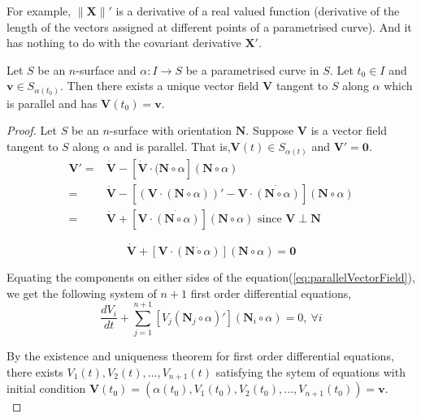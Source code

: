 	
	For example, $\|\mathbf{X}\|'$ is a derivative of a real valued function (derivative of the length of the vectors assigned at different points of a parametrised curve).
	And it has nothing to do with the covariant derivative $\mathbf{X}'$.


\begin{theorem}
	Let $S$ be an $n$-surface and $\alpha : I \to S$ be a parametrised curve in $S$.
	Let $t_0 \in I$ and $\mathbf{v} \in S_{\alpha(t_0)}$.
	Then there exists a unique vector field $\mathbf{V}$ tangent to $S$ along $\alpha$ which is parallel and has $\mathbf{V}(t_0) = \mathbf{v}$.
\end{theorem}
\begin{proof}
	Let $S$ be an $n$-surface with orientation $\mathbf{N}$.
	Suppose $\mathbf{V}$ is a vector field tangent to $S$ along $\alpha$ and is parallel.
	That is,$\mathbf{V}(t) \in S_{\alpha(t)}$ and $\mathbf{V}' = \mathbf{0}$.
\begin{align*}
	\mathbf{V}' = & \dot{\mathbf{V}} - \left[ \dot{\mathbf{V}} \cdot (\mathbf{N} \circ \alpha \right] (\mathbf{N} \circ \alpha) \\
	= & \dot{\mathbf{V}} - \left[ \left(\mathbf{V} \cdot (\mathbf{N} \circ \alpha) \right)' - \mathbf{V} \cdot \dot{(\mathbf{N} \circ \alpha)} \right] (\mathbf{N} \circ \alpha) \\
	= & \dot{\mathbf{V}} + \left[ \mathbf{V} \cdot \dot{(\mathbf{N} \circ \alpha)} \right] (\mathbf{N} \circ \alpha) \text{ since } \mathbf{V} \perp \mathbf{N}
\end{align*}

\begin{equation}
	\dot{\mathbf{V}} + \left[ \mathbf{V} \cdot (\mathbf{N} \dot{\circ} \alpha) \right] (\mathbf{N} \circ \alpha) = \mathbf{0}
	\label{eq:parallelVectorField}
\end{equation}

	Equating the components on either sides of the equation(\ref{eq:parallelVectorField}), we get the following system of $n+1$ first order differential equations,
\begin{equation}
	\dfrac{dV_i}{dt} + \sum_{j = 1}^{n+1} \left[ V_j(\mathbf{N}_j \circ \alpha)' \right](\mathbf{N}_i \circ \alpha) = 0,\ \forall i
\end{equation}
	
	By the existence and uniqueness theorem for first order differential equations, there exists $V_1(t), V_2(t), \dots, V_{n+1}(t)$ satisfying the sytem of equations with initial condition $\mathbf{V}(t_0) = \left( \alpha(t_0), V_1(t_0), V_2(t_0),\dots,V_{n+1}(t_0) \right) = \mathbf{v}$.\\



\end{proof}
